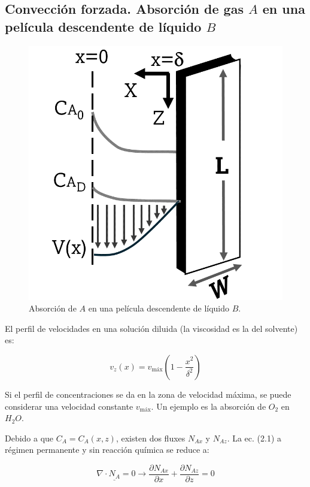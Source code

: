 \subsection{Convección forzada. Absorción de gas $A$ en una película descendente de líquido $B$}

\begin{figure}[H]
	\centering
	\includegraphics[scale=0.2]{./Capitulo2/Imagenes/fig-2-4.PNG}
	\caption{Absorción de $A$ en una película descendente de líquido $B$.}
\end{figure}

El perfil de velocidades en una solución diluida (la viscosidad es la del solvente) es:

\begin{equation}
v_z(x) = v_{\text{máx}} \left( 1 - \frac{x^2}{\delta^2} \right)
\end{equation}

Si el perfil de concentraciones se da en la zona de velocidad máxima, se puede considerar una velocidad constante $v_{\text{máx}}$. Un ejemplo es la absorción de $O_2$ en $H_2O$.

Debido a que $C_A = C_A(x,z)$, existen dos fluxes $N_{Ax}$ y $N_{Az}$. La ec. (2.1) a régimen permanente y sin reacción química se reduce a:

\begin{equation}
	\nabla \cdot \underline{N_A} = 0 \to \frac{\partial N_{Ax}}{\partial x} + \frac{\partial N_{Az}}{\partial z} = 0
\end{equation}

